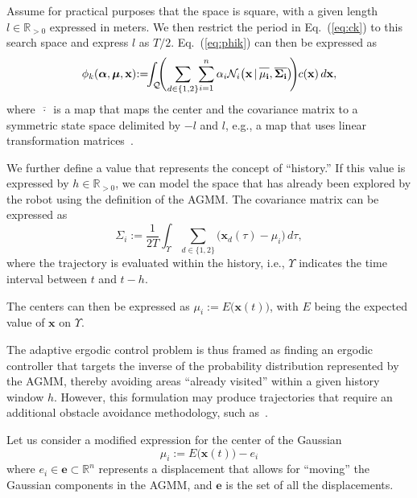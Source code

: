 \documentclass[letterpaper, 10 pt, conference, twoside]{IEEEtran}
\theoremstyle{definition}
\begin{document}
Assume for practical purposes that the space is square, with a given length $l\in\mathbb{R}_{>0}$ expressed in meters. We then restrict the period in Eq.~(\ref{eq:ck}) to this search space and express $l$ as $T/2$. Eq.~(\ref{eq:phik}) can then be expressed as 
\begin{equation}
  \phi_k(\boldsymbol{\alpha},\boldsymbol{\mu},\mathbf{x})\hspace*{-.6ex}:=\hspace*{-1ex}\int_{\mathcal{Q}}{\hspace*{-1ex}\Bigg(\hspace*{-.3ex}\sum_{d\in\{1,2\}}\hspace*{-.5ex}\sum_{i=1}^n\alpha_i\mathcal{N}_i\big(\mathbf{x\,|\,\overline{\rule{0pt}{2.4mm}{\mu_i}},\overline{\Sigma_i}}\big)\hspace*{-.5ex}\Bigg)\hspace*{-.1ex}c(\mathbf{x})\,d\mathbf{x}},
\end{equation}
where $\overline{\,\cdot\,}$ is a map that maps the center and the covariance matrix to a symmetric state space delimited by $-l$ and $l$, e.g., a map that uses linear transformation matrices~\cite{calinon2020mixture}.

We further define a value that represents the concept of ``history.'' If this value is expressed by $h\in\mathbb{R}_{>0}$, we can model the space that has already been explored by the robot using the definition of the AGMM. The covariance matrix can be expressed as 
\begin{equation}
  \Sigma_i:=\frac{1}{2T}\int_\Upsilon\sum_{d\in\{1,2\}}{\big(\mathbf{x}_d(\tau)-\mu_i\big)}\,d\tau,
\end{equation}
where the trajectory is evaluated within the history, i.e., $\Upsilon$ indicates the time interval between $t$ and $t-h$.

The centers can then be expressed as $\mu_i:=E\big(\mathbf{x}(t)\big)$, with $E$ being the expected value of $\mathbf{x}$ on $\Upsilon$. 

The adaptive ergodic control problem is thus framed as finding an ergodic controller that targets the inverse of the probability distribution represented by the AGMM, thereby avoiding areas “already visited” within a given history window $h$. However, this formulation may produce trajectories that require an additional obstacle avoidance methodology, such as~\cite{lerch2023safety}.

Let us consider a modified expression for the center of the Gaussian
\begin{equation}
  \mu_i:=E\big(\mathbf{x}(t)\big)-e_i
\end{equation}
where $e_i\in\mathbf{e}\subset\mathbb{R}^n$ represents a displacement that allows for ``moving'' the Gaussian components in the AGMM, and $\mathbf{e}$ is the set of all the displacements.
\end{document}
